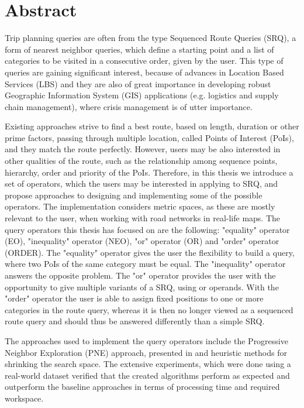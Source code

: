 \chapter{Abstract}
\enlargethispage*{30pt}

Trip planning queries are often from the type Sequenced Route Queries (SRQ), a form of nearest neighbor queries, which define a starting point and a list of categories to be visited in a consecutive order, given by the user. This type of queries are gaining significant interest, because of advances in Location Based Services (LBS) and they are also of great importance in developing robust Geographic Information System (GIS) applications (e.g. logistics and supply chain management), where crisis management is of utter importance. 

Existing approaches strive to find a best route, based on length, duration or other prime factors, passing through multiple location, called Points of Interest (PoIs), and they match the route perfectly. However, users may be also interested in other qualities of the route, such as the relationship among sequence points, hierarchy, order and priority of the PoIs. Therefore, in this thesis we introduce a set of operators, which the users may be interested in applying to SRQ, and propose approaches to designing and implementing some of the possible operators. The implementation considers metric spaces, as these are mostly relevant to the user, when working with road networks in real-life maps.
The query operators this thesis has focused on are the following: "equality" operator (EO), "inequality" operator (NEO), "or" operator (OR) and "order" operator (ORDER). The "equality" operator gives the user the flexibility to build a query, where two PoIs of the same category must be equal. The "inequality" operator answers the opposite problem. The "or" operator provides the user with the opportunity to give multiple variants of a SRQ, using or operands. With the "order" operator the user is able to assign fixed positions to one or more categories in the route query, whereas it is then no longer viewed as a sequenced route query and should thus be answered differently than a simple SRQ.

The approaches used to implement the query operators include the Progressive Neighbor Exploration (PNE) approach, presented in \cite{OSR} and heuristic methods for shrinking the search space. The extensive experiments, which were done using a real-world dataset verified that the created algorithms perform as expected and outperform the baseline approaches in terms of processing time and required workspace.

\pagebreak